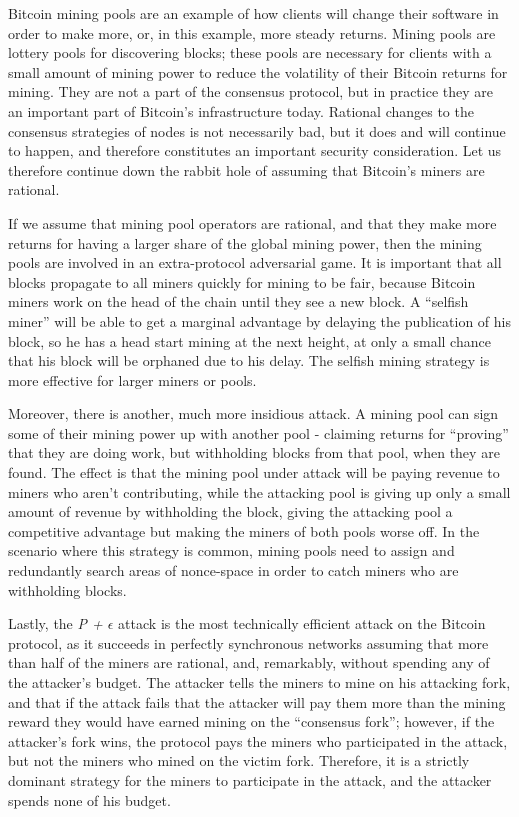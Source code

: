 \documentclass[11pt,a4paper]{article}
\theoremstyle{plain}
\theoremstyle{definition}
\begin{document}
Bitcoin mining pools are an example of how clients will change their software in order to make more, or, in this example, more steady returns. Mining pools are lottery pools for discovering blocks; these pools are necessary for clients with a small amount of mining power to reduce the volatility of their Bitcoin returns for mining. They are not a part of the consensus protocol, but in practice they are an important part of Bitcoin's infrastructure today. Rational changes to the consensus strategies of nodes is not necessarily bad, but it does and will continue to happen, and therefore constitutes an important security consideration. Let us therefore continue down the rabbit hole of assuming that Bitcoin's miners are rational.

If we assume that mining pool operators are rational, and that they make more returns for having a larger share of the global mining power, then the mining pools are involved in an extra-protocol adversarial game. It is important that all blocks propagate to all miners quickly for mining to be fair, because Bitcoin miners work on the head of the chain until they see a new block. A ``selfish miner'' will be able to get a marginal advantage by delaying the publication of his block, so he has a head start mining at the next height, at only a small chance that his block will be orphaned due to his delay. The selfish mining strategy is more effective for larger miners or pools. \cite{SelfishMining}

Moreover, there is another, much more insidious attack. A mining pool can sign some of their mining power up with another pool - claiming returns for ``proving'' that they are doing work, but withholding blocks from that pool, when they are found. The effect is that the mining pool under attack will be paying revenue to miners who aren't contributing, while the attacking pool is giving up only a small amount of revenue by withholding the block, giving the attacking pool a competitive advantage but making the miners of both pools worse off. In the scenario where this strategy is common, mining pools need to assign and redundantly search areas of nonce-space in order to catch miners who are withholding blocks. \cite{BlockWithholding}

Lastly, the \emph{P + $\epsilon$} attack is the most technically efficient attack on the Bitcoin protocol, as it succeeds in perfectly synchronous networks assuming that more than half of the miners are rational, and, remarkably, without spending any of the attacker's budget. The attacker tells the miners to mine on his attacking fork, and that if the attack fails that the attacker will pay them more than the mining reward they would have earned mining on the ``consensus fork''; however, if the attacker's fork wins, the protocol pays the miners who participated in the attack, but not the miners who mined on the victim fork. Therefore, it is a strictly dominant strategy for the miners to participate in the attack, and the attacker spends none of his budget. \cite{P_Plus_Epsilon}
\end{document}
